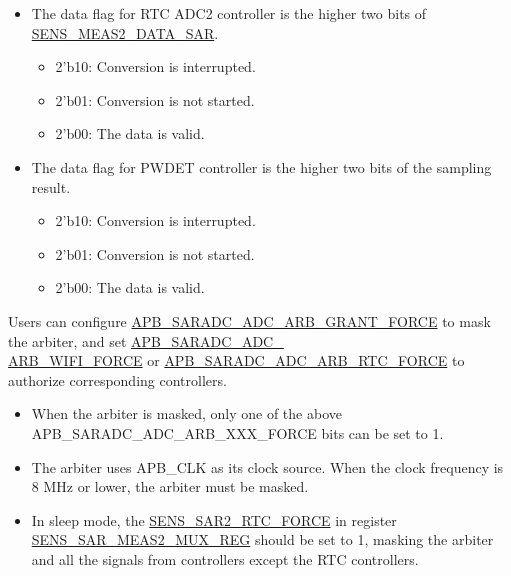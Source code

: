 \documentclass[main\_\_EN.tex]{subfiles}
\begin{document}
\begin{itemize}
    \item The data flag for RTC ADC2 controller is the higher two bits of \hyperlink{fielddesc:SENSMEAS2DATASAR}{SENS\_MEAS2\_DATA\_SAR}.
    \begin{itemize}
        \item 2'b10: Conversion is interrupted.
        \item 2'b01: Conversion is not started.
        \item 2'b00: The data is valid.
    \end{itemize}

    \item The data flag for PWDET controller is the higher two bits of the sampling result.

    \begin{itemize}
        \item 2'b10: Conversion is interrupted.
        \item 2'b01: Conversion is not started.
        \item 2'b00: The data is valid.
    \end{itemize}
\end{itemize}
Users can configure  \hyperref[fielddesc:APBSARADCADCARBGRANTFORCE]{APB\_SARADC\_ADC\_ARB\_GRANT\_FORCE} to mask the arbiter, and set \hyperref[fielddesc:APBSARADCADCARBWIFIFORCE]{APB\_SARADC\_ADC\_\\ARB\_WIFI\_FORCE} or \hyperref[fielddesc:APBSARADCADCARBRTCFORCE]{APB\_SARADC\_ADC\_ARB\_RTC\_FORCE} to authorize corresponding controllers.

\begin{tiplisting}
\vspace{-2em}
\begin{itemize}
    \item When the arbiter is masked, only one of the above APB\_SARADC\_ADC\_ARB\_XXX\_FORCE bits can be set to 1.
    \item The arbiter uses APB\_CLK as its clock source. When the clock frequency is 8 MHz or lower, the arbiter must be masked.
    \item In sleep mode, the \hyperref[fielddesc:SENSSAR2RTCFORCE]{SENS\_SAR2\_RTC\_FORCE} in register \hyperref[regdesc:SENSSARMEAS2MUXREG]{SENS\_SAR\_MEAS2\_MUX\_REG} should be set to 1, masking the arbiter and all the signals from controllers except the RTC controllers.
\end{itemize}
\end{tiplisting}
\end{document}
